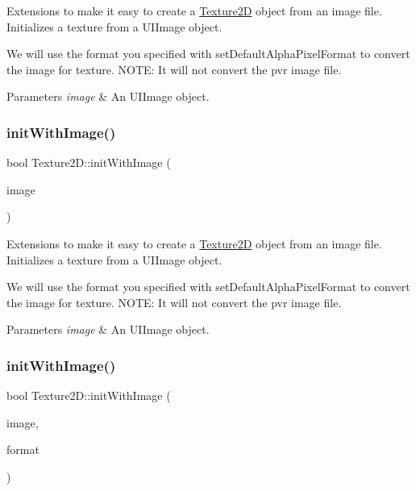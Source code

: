 Extensions to make it easy to create a \hyperlink{classTexture2D}{Texture2D} object from an image file. Initializes a texture from a U\+I\+Image object.

We will use the format you specified with set\+Default\+Alpha\+Pixel\+Format to convert the image for texture. N\+O\+TE\+: It will not convert the pvr image file. 
\begin{DoxyParams}{Parameters}
{\em image} & An U\+I\+Image object. \\
\hline
\end{DoxyParams}
\mbox{\label{classTexture2D_a1ae4992389059e5f78785e28d28d53be}} 
\subsubsection{\texorpdfstring{init\+With\+Image()}{initWithImage()}\hspace{0.1cm}{\footnotesize\ttfamily [2/4]}}
{\footnotesize\ttfamily bool Texture2\+D\+::init\+With\+Image (\begin{DoxyParamCaption}\item[{Image $\ast$}]{image }\end{DoxyParamCaption})}

Extensions to make it easy to create a \hyperlink{classTexture2D}{Texture2D} object from an image file. Initializes a texture from a U\+I\+Image object.

We will use the format you specified with set\+Default\+Alpha\+Pixel\+Format to convert the image for texture. N\+O\+TE\+: It will not convert the pvr image file. 
\begin{DoxyParams}{Parameters}
{\em image} & An U\+I\+Image object. \\
\hline
\end{DoxyParams}
\mbox{\label{classTexture2D_a52292343ab1e6f4f3e20d35181d98b5f}} 
\subsubsection{\texorpdfstring{init\+With\+Image()}{initWithImage()}\hspace{0.1cm}{\footnotesize\ttfamily [3/4]}}
{\footnotesize\ttfamily bool Texture2\+D\+::init\+With\+Image (\begin{DoxyParamCaption}\item[{Image $\ast$}]{image,  }\item[{\hyperlink{classTexture2D_a45d9d8bb5a0669def36bbdfbfb91d220}{Pixel\+Format}}]{format }\end{DoxyParamCaption})}

